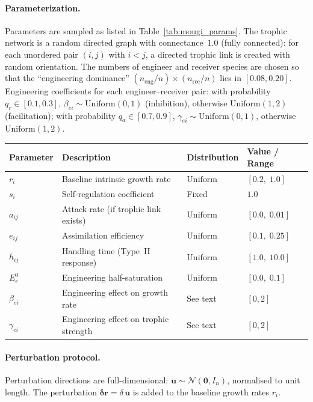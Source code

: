 \documentclass[pdflatex,sn-mathphys-num]{sn-jnl}%
\begin{document}
\paragraph{Parameterization.} Parameters are sampled as listed in Table~\ref{tab:mougi_params}. The trophic network is a random directed graph with connectance~$1.0$ (fully connected): for each unordered pair $(i,j)$ with $i < j$, a directed trophic link is created with random orientation. The numbers of engineer and receiver species are chosen so that the ``engineering dominance'' $(n_{\mathrm{eng}}/n)\times(n_{\mathrm{rec}}/n)$ lies in $[0.08,0.20]$. Engineering coefficients for each engineer--receiver pair: with probability $q_r \in [0.1, 0.3]$, $\beta_{ei} \sim \mathrm{Uniform}(0,1)$ (inhibition), otherwise $\mathrm{Uniform}(1,2)$ (facilitation); with probability $q_a \in [0.7, 0.9]$, $\gamma_{ei} \sim \mathrm{Uniform}(0,1)$, otherwise $\mathrm{Uniform}(1,2)$.
\begin{center}
\begin{tabular}{llll}
\hline
Parameter & Description & Distribution & Value / Range \\
\hline
$r_i$  & Baseline intrinsic growth rate  & $\mathrm{Uniform}$ & $[0.2,\;1.0]$ \\
$s_i$  & Self-regulation coefficient   & Fixed    & $1.0$ \\
$a_{ij}$ & Attack rate (if trophic link exists) & $\mathrm{Uniform}$ & $[0.0,\;0.01]$ \\
$e_{ij}$ & Assimilation efficiency    & $\mathrm{Uniform}$ & $[0.1,\;0.25]$ \\
$h_{ij}$ & Handling time (Type~II response) & $\mathrm{Uniform}$ & $[1.0,\;10.0]$ \\
$E^0_e$  & Engineering half-saturation   & $\mathrm{Uniform}$ & $[0.0,\;0.1]$ \\
$\beta_{ei}$ & Engineering effect on growth rate & See text   & $[0,2]$ \\
$\gamma_{ei}$ & Engineering effect on trophic strength & See text  & $[0,2]$ \\
\hline
\end{tabular}
\label{tab:mougi_params}
\end{center}

\paragraph{Perturbation protocol.} Perturbation directions are full-dimensional: $\mathbf{u} \sim \mathcal{N}(\mathbf{0}, I_n)$, normalised to unit length. The perturbation $\boldsymbol{\delta r} = \delta\,\mathbf{u}$ is added to the baseline growth rates $r_i$.
\end{document}
